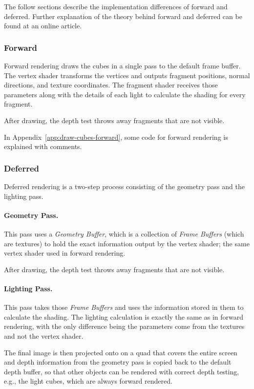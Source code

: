 The follow sections describe the implementation differences of forward and deferred.
Further explanation of the theory behind forward and deferred can be found at an online article\autocite{owens_forward_2013}.

\subsubsection{Forward}
Forward rendering draws the cubes in a single pass to the default frame buffer.
The vertex shader transforms the vertices and outputs fragment positions, normal directions, and texture coordinates.
The fragment shader receives those parameters along with the details of each light to calculate the shading for every fragment.

After drawing, the depth test throws away fragments that are not visible.

In Appendix~\ref{app:draw-cubes-forward}, some code for forward rendering is explained with comments.

\subsubsection{Deferred}
Deferred rendering is a two-step process consisting of the geometry pass and the lighting pass.

\paragraph{Geometry Pass.}
This pass uses a \emph{Geometry Buffer}, which is a collection of \emph{Frame Buffers} (which are textures) to hold the exact information output by the vertex shader; the same vertex shader used in forward rendering.

After drawing, the depth test throws away fragments that are not visible.

\paragraph{Lighting Pass.}
This pass takes those \emph{Frame Buffers} and uses the information stored in them to calculate the shading.
The lighting calculation is exactly the same as in forward rendering, with the only difference being the parameters come from the textures and not the vertex shader.

The final image is then projected onto on a quad that covers the entire screen and depth information from the geometry pass is copied back to the default depth buffer, so that other objects can be rendered with correct depth testing, e.g., the light cubes, which are always forward rendered.\\

